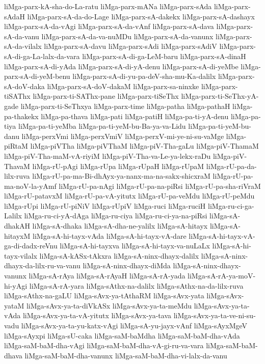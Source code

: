 {liMga-parx-kA-sha-do-La-ratu
liMga-parx-mANa
liMga-parx-sAda
liMga-parx-sAdaH
liMga-parx-sA-da-do-Lage
liMga-parx-sA-dakekx
liMga-parx-sA-dashayx
liMga-parx-sA-da-vAgi
liMga-parx-sA-da-vAnf
liMga-parx-sA-dava
liMga-parx-sA-da-vanu
liMga-parx-sA-da-va-nuMDu
liMga-parx-sA-da-vanunx
liMga-parx-sA-da-vilalx
liMga-parx-sA-davu
liMga-parx-sAdi
liMga-parx-sAdiV
liMga-parx-sA-di-ga-La-lalx-da-vara
liMga-parx-sA-di-ga-LeM-baru
liMga-parx-sA-dinaH
liMga-parx-sA-di-yAda
liMga-parx-sA-di-yA-denu
liMga-parx-sA-di-yeMbe
liMga-parx-sA-di-yeM-benu
liMga-parx-sA-di-yu-pa-deV-sha-mu-Ka-dalilx
liMga-parx-sA-doV-daka
liMga-parx-sA-doV-dakaM
liMga-parx-sa-ninxke
liMga-parx-tiSAThx
liMga-parx-ti-SAThx-pane
liMga-parx-tiSeThx
liMga-parx-ti-SeThx-yA-gade
liMga-parx-ti-SeThxya
liMga-parx-time
liMga-patha
liMga-pathaH
liMga-pa-thakekx
liMga-pa-thava
liMga-pati
liMga-patiH
liMga-pa-ti-yA-denu
liMga-pa-tiya
liMga-pa-ti-yeMba
liMga-pa-ti-yeM-bu-Ba-ya-va-Lidu
liMga-pa-ti-yeM-bu-danu
liMga-perxVmi
liMga-perxVmiV
liMga-perxV-mi-ye-ni-su-vaMge
liMga-piRtaM
liMga-piVTha
liMga-piVThaM
liMga-piV-Tha-gaLu
liMga-piV-ThamaM
liMga-piV-Tha-maM-vA-riyiM
liMga-piV-Tha-va-Le-ya-lekx-raDu
liMga-piV-ThavaM
liMga-rU-pAgi
liMga-rUpa
liMga-rUpaH
liMga-rUpaM
liMga-rU-pa-da-lilx-ruva
liMga-rU-pa-ma-Bi-dhAyx-ya-nanx-ma-na-sakx-shicxraM
liMga-rU-pa-ma-noV-la-yAmf
liMga-rU-pa-nAgi
liMga-rU-pa-na-piRsi
liMga-rU-pa-sha-riVraM
liMga-rU-patavxM
liMga-rU-pa-vA-yitutx
liMga-rU-pa-veMdu
liMga-rU-peMdu
liMga-rUpi
liMga-rU-piNiV
liMga-rUpiV
liMga-ruci
liMga-ruciH
liMga-ru-ci-ga-Lalilx
liMga-ru-ci-yA-dAga
liMga-ru-ciya
liMga-ru-ci-ya-na-piRsi
liMga-sA-dhakAH
liMga-sA-dhaka
liMga-sA-dha-ne-yalilx
liMga-sA-hitayx
liMga-sA-hitayxM
liMga-sA-hi-tayx-vAda
liMga-sA-hi-tayx-vA-dare
liMga-sA-hi-tayx-vA-ga-di-dadx-reVnu
liMga-sA-hi-tayxva
liMga-sA-hi-tayx-va-nuLaLx
liMga-sA-hi-tayx-vilalx
liMga-sA-kASx-tAkxra
liMga-sA-ninx-dhayx-dalilx
liMga-sA-ninx-dhayx-da-lilx-ru-va-vanu
liMga-sA-ninx-dhayx-diMda
liMga-sA-ninx-dhayx-vanunx
liMga-sA-rAya
liMga-sA-rAyaH
liMga-sA-rA-yada
liMga-sA-rA-ya-moV-hi-yAgi
liMga-sA-rA-yara
liMga-sAthx-na-dalilx
liMga-sAthx-na-da-lilx-ruva
liMga-sAthx-na-gaLU
liMga-sAvx-ya-tAthaRM
liMga-sAvx-yata
liMga-sAvx-yataM
liMga-sAvx-ya-ta-diVkASx
liMga-sAvx-ya-ta-meMdu
liMga-sAvx-ya-ta-vAda
liMga-sAvx-ya-ta-vA-yitutx
liMga-sAvx-ya-tava
liMga-sAvx-ya-ta-ve-ni-su-vadu
liMga-sAvx-ya-ta-yu-katx-vAgi
liMga-sA-yu-jayx-vAnf
liMga-sAyxMgeV
liMga-sAyxpi
liMga-sU-caka
liMga-saM-baMdha
liMga-saM-baM-dha-vAda
liMga-saM-baM-dha-vAgi
liMga-saM-baM-dha-vA-gi-ru-va-vara
liMga-saM-baM-dhava
liMga-saM-baM-dha-vanunx
liMga-saM-baM-dha-vi-lalx-da-vanu
}

